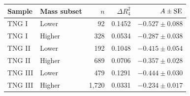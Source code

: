 \begin{tabular}{llrrr}\toprule
Sample & Mass subset & $n$ & $\Delta R^2_4$ & $A\pm{\rm SE}$ \\\midrule
TNG I & Lower & 92 & 0.1452 & $-0.527 \pm 0.088$ \\
TNG I & Higher & 328 & 0.0534 & $-0.287 \pm 0.038$ \\
TNG II & Lower & 192 & 0.1048 & $-0.415 \pm 0.054$ \\
TNG II & Higher & 689 & 0.0706 & $-0.357 \pm 0.028$ \\
TNG III & Lower & 479 & 0.1291 & $-0.444 \pm 0.030$ \\
TNG III & Higher & 1,720 & 0.0331 & $-0.234 \pm 0.017$ \\
\bottomrule\end{tabular}
